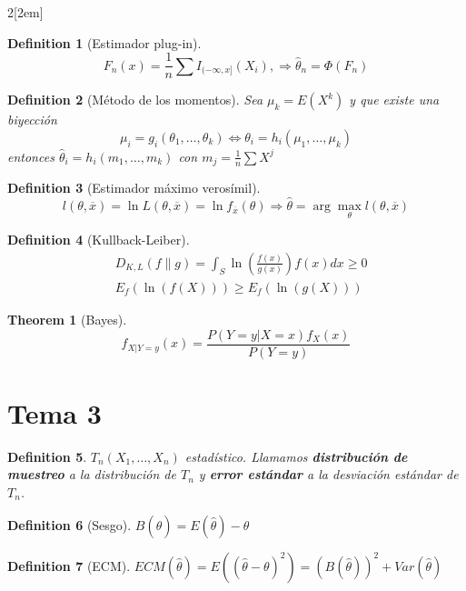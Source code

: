 \documentclass[leqno]{article}
\newtheorem*{theorem}{Theorem}
\newtheorem*{definition}{Definition}
\begin{document}
\begin{multicols}{2}[\columnsep2em]
\begin{definition}[Estimador plug-in]
 \[
   F_n(x) = \frac{1}{n} \sum I_{(-\infty, x]}(X_i), \Rightarrow \hat{\theta }_n = \Phi (F_n)
\] 
\end{definition}

\begin{definition}[Método de los momentos]
Sea $\mu_k = E(X^k)$ y que existe una biyección
\[
\mu_i = g_i(\theta_1, \ldots, \theta _k) \iff \theta _i = h_i(\mu_1, \ldots, \mu _k)
\] 
entonces $\hat{\theta }_i = h_i(m_1,\ldots, m_k)$ con $m_j = \frac{1}{n}\sum X^j$
\end{definition}

\begin{definition}[Estimador máximo verosímil]
\[
l(\theta , \overline{x})= \ln L(\theta , \overline{x}) = \ln f_{\overline{x}}(\theta ) \Rightarrow \hat{\theta } = \arg \max_{\theta } l(\theta , \overline{x})
\] 
\end{definition}

\begin{definition}[Kullback-Leiber]
  \begin{align*}
  &D_{K, L}(f \| g) = \int_S \ln\left( \frac{f(x)}{g(x)}\right)f(x)dx \ge 0\\
  &E_f(\ln(f(X)))\ge E_f(\ln(g(X)))
  \end{align*}
\end{definition}

\begin{theorem}[Bayes]
  \[
  f_{X|Y=y}(x)= \frac{P(Y=y|X=x)f_X(x)}{P(Y=y)}
  \] 

\end{theorem}

\section{Tema 3}
\begin{definition} $T_n(X_1,\ldots, X_n)$ estadístico. Llamamos \textbf{distribución de muestreo} a la distribución de $T_n$ y  \textbf{error estándar} a la desviación estándar de $T_n$.
\end{definition}
\begin{definition}[Sesgo]
$B(\hat{\theta })=E(\hat{\theta })-\theta$
\end{definition}

\begin{definition}[ECM] $ECM(\hat{\theta })=E((\hat{\theta }-\theta )^2) = (B(\hat{\theta }))^2+ Var(\hat{\theta})$
\end{definition}



\end{multicols}
\end{document}
